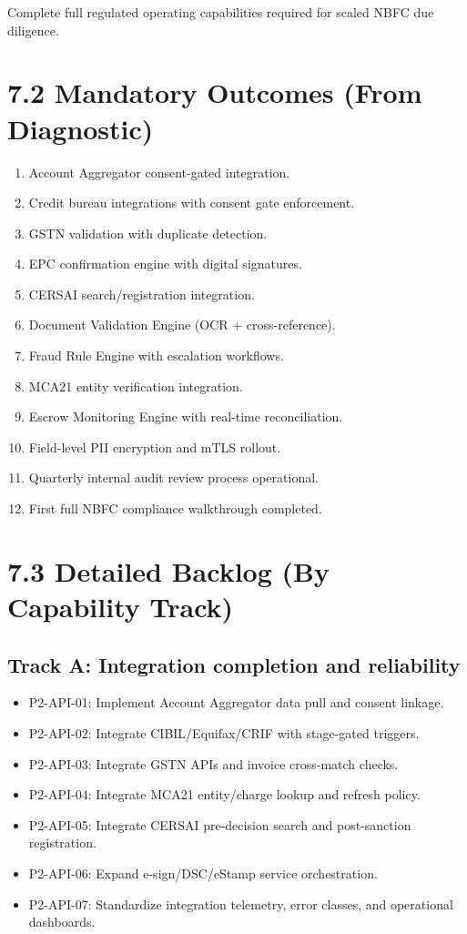 ﻿\documentclass[12pt]{article}
\begin{document}
Complete full regulated operating capabilities required for scaled NBFC due diligence.


\section{7.2 Mandatory Outcomes (From Diagnostic)}


\begin{enumerate}
\item Account Aggregator consent-gated integration.
\item Credit bureau integrations with consent gate enforcement.
\item GSTN validation with duplicate detection.
\item EPC confirmation engine with digital signatures.
\item CERSAI search/registration integration.
\item Document Validation Engine (OCR + cross-reference).
\item Fraud Rule Engine with escalation workflows.
\item MCA21 entity verification integration.
\item Escrow Monitoring Engine with real-time reconciliation.
\item Field-level PII encryption and mTLS rollout.
\item Quarterly internal audit review process operational.
\item First full NBFC compliance walkthrough completed.
\end{enumerate}

\section{7.3 Detailed Backlog (By Capability Track)}


\subsection{Track A: Integration completion and reliability}


\begin{itemize}
\item P2-API-01: Implement Account Aggregator data pull and consent linkage.
\item P2-API-02: Integrate CIBIL/Equifax/CRIF with stage-gated triggers.
\item P2-API-03: Integrate GSTN APIs and invoice cross-match checks.
\item P2-API-04: Integrate MCA21 entity/charge lookup and refresh policy.
\item P2-API-05: Integrate CERSAI pre-decision search and post-sanction registration.
\item P2-API-06: Expand e-sign/DSC/eStamp service orchestration.
\item P2-API-07: Standardize integration telemetry, error classes, and operational dashboards.
\end{itemize}
\end{document}
